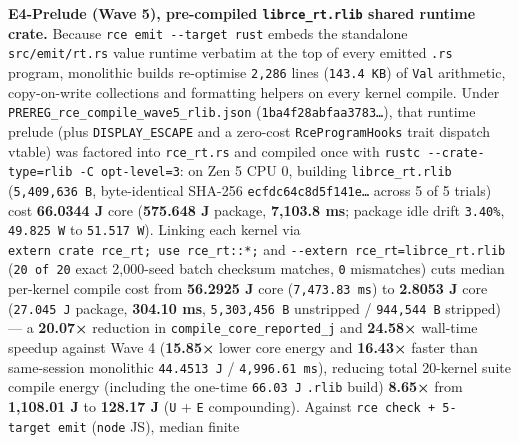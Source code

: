 \documentclass[10pt,letterpaper]{article}
\begin{document}
\textbf{E4-Prelude (Wave 5), pre-compiled \texttt{librce\_\allowbreak{}rt.\allowbreak{}rlib}
shared runtime crate.} Because \texttt{rce\ emit\ -\allowbreak{}\/\allowbreak{}-\allowbreak{}target\ rust}
embeds the standalone \texttt{src/\allowbreak{}emit/\allowbreak{}rt.\allowbreak{}rs} value runtime verbatim at
the top of every emitted \texttt{.rs} program, monolithic builds
re-optimise \texttt{2,286} lines (\texttt{143.4\ KB}) of \texttt{Val}
arithmetic, copy-on-write collections and formatting helpers on every
kernel compile. Under \texttt{PREREG\_\allowbreak{}rce\_\allowbreak{}compile\_\allowbreak{}wave5\_\allowbreak{}rlib.\allowbreak{}json}
(\texttt{1ba4f28a\allowbreak{}bfaa3783…}), that runtime prelude (plus
\texttt{DISPLAY\_\allowbreak{}ESCAPE} and a zero-cost \texttt{RceProgramHooks} trait
dispatch vtable) was factored into \texttt{rce\_\allowbreak{}rt.\allowbreak{}rs} and compiled once
with \texttt{rustc\ -\allowbreak{}\/\allowbreak{}-\allowbreak{}crate-\allowbreak{}type=rlib\ -\allowbreak{}C\ opt-\allowbreak{}level=3}: on Zen 5 CPU
0, building \texttt{librce\_\allowbreak{}rt.\allowbreak{}rlib} (\texttt{5,\allowbreak{}409,\allowbreak{}636\ B},
byte-identical SHA-256 \texttt{ecfdc64c\allowbreak{}8d5f141e…} across 5 of 5 trials)
cost \textbf{66.0344 J} core (\textbf{575.648 J} package,
\textbf{7,103.8 ms}; package idle drift \texttt{3.40\%},
\texttt{49.825\ W} to \texttt{51.517\ W}). Linking each kernel via
\texttt{extern\ crate\ rce\_\allowbreak{}rt;\ use\ rce\_\allowbreak{}rt::*;} and
\texttt{-\allowbreak{}\/\allowbreak{}-\allowbreak{}extern\ rce\_\allowbreak{}rt=librce\_\allowbreak{}rt.\allowbreak{}rlib} (\texttt{20\ of\ 20} exact
2,000-seed batch checksum matches, \texttt{0} mismatches) cuts median
per-kernel compile cost from \textbf{56.2925 J} core
(\texttt{7,\allowbreak{}473.\allowbreak{}83\ ms}) to \textbf{2.8053 J} core (\texttt{27.045\ J}
package, \textbf{304.10 ms}, \texttt{5,\allowbreak{}303,\allowbreak{}456\ B} unstripped /
\texttt{944,\allowbreak{}544\ B} stripped) --- a \textbf{20.07×} reduction in
\texttt{compile\_\allowbreak{}core\_\allowbreak{}reported\_\allowbreak{}j} and \textbf{24.58×} wall-time
speedup against Wave 4 (\textbf{15.85×} lower core energy and
\textbf{16.43×} faster than same-session monolithic \texttt{44.\allowbreak{}4513\ J}
/ \texttt{4,\allowbreak{}996.\allowbreak{}61\ ms}), reducing total 20-kernel suite compile energy
(including the one-time \texttt{66.03\ J} \texttt{.rlib} build)
\textbf{8.65×} from \textbf{1,108.01 J} to \textbf{128.17 J} (\texttt{U}
+ \texttt{E} compounding). Against
\texttt{rce\ check\ +\ 5-\allowbreak{}target\ emit} (\texttt{node} JS), median finite
\end{document}
